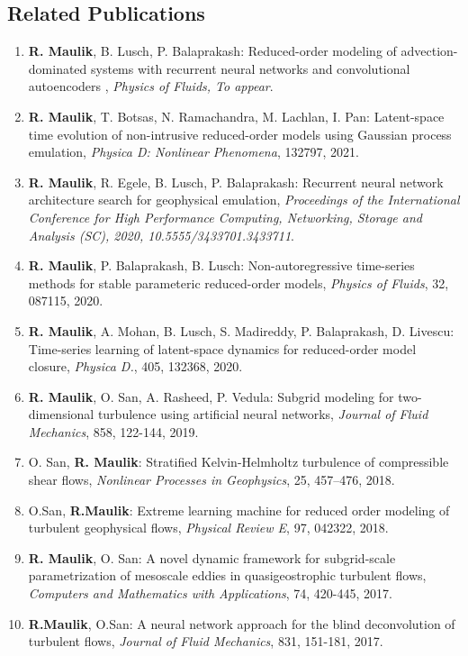 \documentclass[11pt]{article}
\begin{document}
\subsection*{Related Publications}
\begin{enumerate}
\parskip = -2pt

\item \textbf{R. Maulik}, B. Lusch, P. Balaprakash: Reduced-order modeling of advection-dominated systems with recurrent neural networks and convolutional autoencoders , {\it Physics of Fluids, To appear}.

\item \textbf{R. Maulik}, T. Botsas, N. Ramachandra, M. Lachlan, I. Pan: Latent-space time evolution of non-intrusive reduced-order models using Gaussian process emulation, {\it Physica D: Nonlinear Phenomena}, 132797, 2021. 

\item \textbf{R. Maulik}, R. Egele, B. Lusch,  P. Balaprakash: Recurrent neural network architecture search for geophysical emulation, {\it Proceedings of the International Conference for High Performance Computing, Networking, Storage and Analysis (SC), 2020, 10.5555/3433701.3433711}. 

\item \textbf{R. Maulik}, P. Balaprakash, B. Lusch: Non-autoregressive time-series methods for stable parameteric reduced-order models, {\it Physics of Fluids}, 32, 087115, 2020. 

\item \textbf{R. Maulik}, A. Mohan, B. Lusch, S. Madireddy, P. Balaprakash, D. Livescu: Time-series learning of latent-space dynamics for reduced-order model closure, {\it Physica D.}, 405, 132368, 2020.

\item \textbf{R. Maulik}, O. San, A. Rasheed, P. Vedula: Subgrid modeling for two-dimensional turbulence using artificial neural networks, {\it Journal of Fluid Mechanics}, 858, 122-144, 2019.

\item O. San, \textbf{R. Maulik}: Stratified Kelvin-Helmholtz turbulence of compressible shear flows, {\it Nonlinear Processes in Geophysics}, 25, 457--476, 2018.

\item O.San, \textbf{R.Maulik}: Extreme learning machine for reduced order modeling of turbulent geophysical flows, {\it Physical Review E}, 97, 042322, 2018.

\item \textbf{R. Maulik}, O. San: A novel dynamic framework for subgrid-scale parametrization of mesoscale eddies in quasigeostrophic turbulent flows, {\it Computers and Mathematics with Applications}, 74, 420-445, 2017. 

\item \textbf{R.Maulik}, O.San: A neural network approach for the blind deconvolution of turbulent flows, {\it Journal of Fluid Mechanics}, 831, 151-181, 2017.

\end{enumerate}
\end{document}
